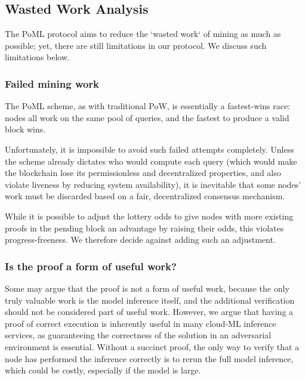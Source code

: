 

\subsection{Wasted Work Analysis}
The PoML protocol aims to reduce the `wasted work` of mining as much as possible; yet, there are still limitations in our protocol. We discuss such limitations below.


\subsubsection{Failed mining work}
The PoML scheme, as with traditional PoW, is essentially a fastest-wins race: nodes all work on the same pool of queries, and the fastest to produce a valid block wins.

Unfortunately, it is impossible to avoid such failed attempts completely. Unless the scheme already dictates who would compute each query (which would make the blockchain lose its permissionless and decentralized properties, and also violate liveness by reducing system availability), 
it is inevitable that some nodes' work must be discarded based on a fair, decentralized consensus mechanism. 

While it is possible to adjust the lottery odds to give nodes with more existing proofs in the pending block an advantage by raising their odds, this violates progress-freeness. We therefore decide against adding such an adjustment.

\subsubsection{Is the proof a form of useful work?}
Some may argue that the proof is not a form of useful work, because the only truly valuable work is the model inference itself, and the additional verification should not be considered part of useful work. 
However, we argue that having a proof of correct execution is inherently useful in many cloud-ML inference services, as guaranteeing the correctness of the solution in an adversarial environment is essential. Without a succinct proof, the only way to verify 
that a node has performed the inference correctly is to rerun the full model inference, which could be costly, especially if the model is large. 

